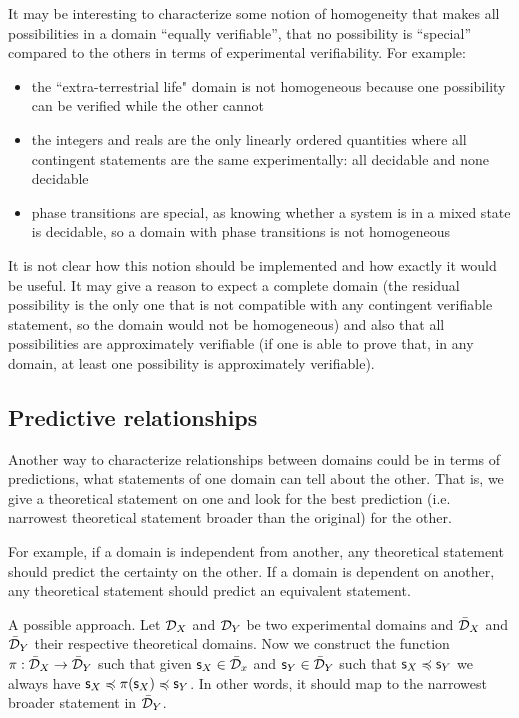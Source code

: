 \documentclass[11pt,letterpaper,fleqn]{memoir} %
\begin{document}
It may be interesting to characterize some notion of homogeneity that makes all possibilities in a domain ``equally verifiable'', that no possibility is ``special'' compared to the others in terms of experimental verifiability. For example:
\begin{itemize}
	\item the ``extra-terrestrial life" domain is not homogeneous because one possibility can be verified while the other cannot
	\item the integers and reals are the only linearly ordered quantities where all contingent statements are the same experimentally: all decidable and none decidable
	\item phase transitions are special, as knowing whether a system is in a mixed state is decidable, so a domain with phase transitions is not homogeneous
\end{itemize}

It is not clear how this notion should be implemented and how exactly it would be useful. It may give a reason to expect a complete domain (the residual possibility is the only one that is not compatible with any contingent verifiable statement, so the domain would not be homogeneous) and also that all possibilities are approximately verifiable (if one is able to prove that, in any domain, at least one possibility is approximately verifiable).

\subsection{Predictive relationships}

Another way to characterize relationships between domains could be in terms of predictions, what statements of one domain can tell about the other. That is, we give a theoretical statement on one and look for the best prediction (i.e. narrowest theoretical statement broader than the original) for the other.

For example, if a domain is independent from another, any theoretical statement should predict the certainty on the other. If a domain is dependent on another, any theoretical statement should predict an equivalent statement.

A possible approach. Let $\mathcal{D}_X$ and $\mathcal{D}_Y$ be two experimental domains and $\bar{\mathcal{D}}_X$ and $\bar{\mathcal{D}}_Y$ their respective theoretical domains. Now we construct the function $\pi: \bar{\mathcal{D}}_X \to \bar{\mathcal{D}}_Y$ such that given $\mathsf{s}_X \in \bar{\mathcal{D}}_x$ and $\mathsf{s}_Y \in \bar{\mathcal{D}}_Y$ such that $\mathsf{s}_X \preccurlyeq \mathsf{s}_Y$ we always have $\mathsf{s}_X \preccurlyeq \pi(\mathsf{s}_X) \preccurlyeq \mathsf{s}_Y$. In other words, it should map to the narrowest broader statement in $\bar{\mathcal{D}}_Y$.
\end{document}
